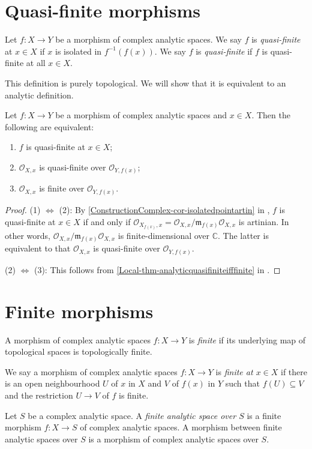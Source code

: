 \section{Quasi-finite morphisms}

\begin{definition}
    Let $f:X\rightarrow Y$ be a morphism of complex analytic spaces. We say $f$ is \emph{quasi-finite} at $x\in X$ if $x$ is isolated in $f^{-1}(f(x))$.
    We say $f$ is \emph{quasi-finite} if $f$ is quasi-finite at all $x\in X$.
\end{definition}
This definition is purely topological. We will show that it is equivalent to an analytic definition.

\begin{proposition}\label{prop-quasifinitechar}
    Let $f:X\rightarrow Y$ be a morphism of complex analytic spaces and $x\in X$. Then the following are equivalent:
    \begin{enumerate}
        \item $f$ is quasi-finite at $x\in X$;
        \item $\mathcal{O}_{X,x}$ is quasi-finite over $\mathcal{O}_{Y,f(x)}$;
        \item $\mathcal{O}_{X,x}$ is finite over $\mathcal{O}_{Y,f(x)}$.
    \end{enumerate}
\end{proposition}
\begin{proof}
    (1) $\Leftrightarrow$ (2): By \cref{ConstructionComplex-cor-isolatedpointartin} in , $f$ is quasi-finite at $x\in X$ if and only if $\mathcal{O}_{X_{f(x)},x}=\mathcal{O}_{X,x}/\mathfrak{m}_{f(x)}\mathcal{O}_{X,x}$ is artinian. In other words, $\mathcal{O}_{X,x}/\mathfrak{m}_{f(x)}\mathcal{O}_{X,x}$ is finite-dimensional over $\mathbb{C}$. The latter is equivalent to that $\mathcal{O}_{X,x}$ is quasi-finite over $\mathcal{O}_{Y,f(x)}$. 

    (2) $\Leftrightarrow$ (3): This follows from \cref{Local-thm-analyticquasifiniteifffinite} in .
\end{proof}


\section{Finite morphisms}


\begin{definition}
    A morphism of complex analytic spaces $f:X\rightarrow Y$ is \emph{finite} if its underlying map of topological spaces is topologically finite.

    We say a morphism of complex analytic spaces $f:X\rightarrow Y$ is \emph{finite at $x\in X$} if there is an open neighbourhood $U$ of $x$ in $X$ and $V$ of $f(x)$ in $Y$ such that $f(U)\subseteq V$ and the restriction $U\rightarrow V$ of $f$ is finite.

    Let $S$ be a complex analytic space. A \emph{finite analytic space over $S$} is a finite morphism $f:X\rightarrow S$ of complex analytic spaces. A morphism between finite analytic spaces over $S$ is a morphism of complex analytic spaces over $S$.
\end{definition}


